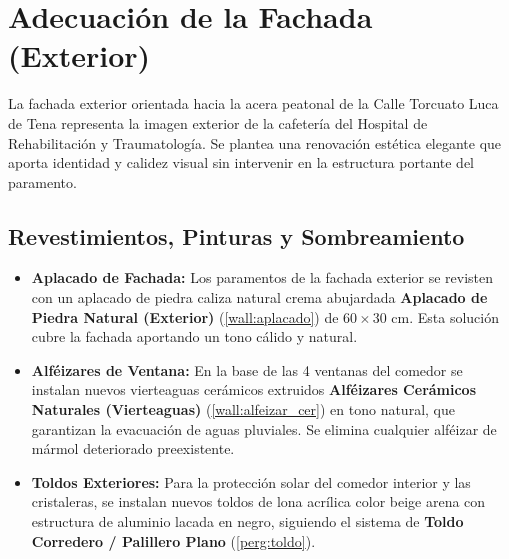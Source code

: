 \section{Adecuación de la Fachada (Exterior)}

La fachada exterior orientada hacia la acera peatonal de la Calle Torcuato Luca de Tena representa la imagen exterior de la cafetería del Hospital de Rehabilitación y Traumatología. Se plantea una renovación estética elegante que aporta identidad y calidez visual sin intervenir en la estructura portante del paramento.

\subsection{Revestimientos, Pinturas y Sombreamiento}
\begin{itemize}
    \item \textbf{Aplacado de Fachada:} Los paramentos de la fachada exterior se revisten con un aplacado de piedra caliza natural crema abujardada \textbf{Aplacado de Piedra Natural (Exterior)} (\ref{wall:aplacado}) de $60\times30$ cm. Esta solución cubre la fachada aportando un tono cálido y natural.
    \item \textbf{Alféizares de Ventana:} En la base de las 4 ventanas del comedor se instalan nuevos vierteaguas cerámicos extruidos \textbf{Alféizares Cerámicos Naturales (Vierteaguas)} (\ref{wall:alfeizar_cer}) en tono natural, que garantizan la evacuación de aguas pluviales. Se elimina cualquier alféizar de mármol deteriorado preexistente.
    \item \textbf{Toldos Exteriores:} Para la protección solar del comedor interior y las cristaleras, se instalan nuevos toldos de lona acrílica color beige arena con estructura de aluminio lacada en negro, siguiendo el sistema de \textbf{Toldo Corredero / Palillero Plano} (\ref{perg:toldo}).
\end{itemize}


